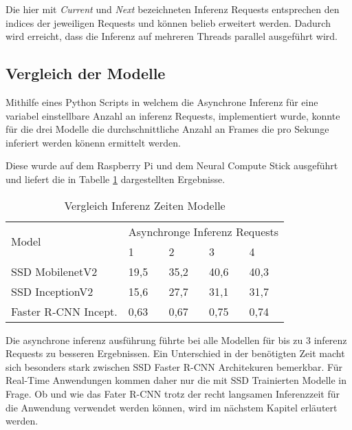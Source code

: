 Die hier mit \textit{Current} und \textit{Next} bezeichneten 
Inferenz Requests entsprechen den indices der jeweiligen Requests
und können belieb erweitert werden. Dadurch
wird erreicht, dass die Inferenz auf mehreren Threads 
parallel ausgeführt wird.



\subsection{Vergleich der Modelle}

Mithilfe eines Python Scripts in welchem die Asynchrone Inferenz 
für eine variabel einstellbare Anzahl an inferenz Requests,
implementiert wurde, konnte für die drei Modelle die 
durchschnittliche Anzahl an Frames die pro Sekunge inferiert werden 
könenn ermittelt werden.

Diese wurde auf dem Raspberry Pi und dem Neural Compute Stick 
ausgeführt und liefert die in Tabelle \ref{table:infertime}
dargestellten Ergebnisse.

\vspace{1cm}
\begin{table}[htb]
  \centering
  \label{table:infertime}
  \begin{tabular}{m{}|m{}<{\centering}|m{}<{\centering}|m{}<{\centering}|m{}<{\centering}}
  \hline
  \multirow{2}{*}{Model} & \multicolumn{4}{c}{Asynchronge Inferenz Requests} \\ \cline{2-5} 
                         & 1           & 2          & 3          & 4          \\ \hline\hline
  SSD MobilenetV2        & 19,5           & 35,2          & 40,6          & 40,3          \\
  SSD InceptionV2        & 15,6           & 27,7          & 31,1          & 31,7          \\
  Faster R-CNN Incept.   & 0,63           & 0,67          & 0,75          & 0,74          \\ \hline
  \end{tabular}
  \caption{Vergleich Inferenz Zeiten Modelle}
\end{table}
\vspace{1cm}

Die asynchrone inferenz ausführung führte bei alle Modellen 
für bis zu 3 inferenz Requests zu besseren Ergebnissen.
Ein Unterschied in der benötigten Zeit macht sich besonders 
stark zwischen SSD Faster R-CNN Architekuren bemerkbar.
Für Real-Time Anwendungen kommen daher nur die mit SSD Trainierten 
Modelle in Frage. 
Ob und wie das Fater R-CNN trotz der recht langsamen Inferenzzeit 
für die Anwendung verwendet werden können, wird im nächstem Kapitel 
erläutert werden.

